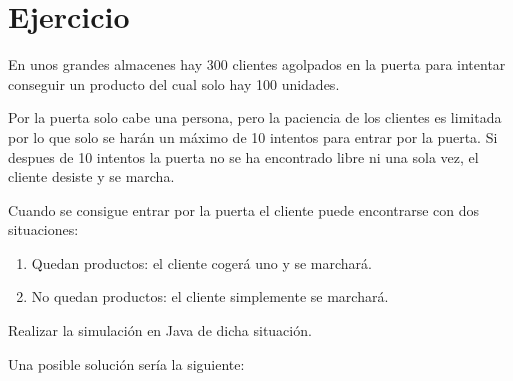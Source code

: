 \documentclass[letterpaper,10pt,spanish]{sphinxmanual}
\begin{document}
\section{Ejercicio}
\label{\detokenize{textos/tema2:ejercicio}}
En unos grandes almacenes hay 300 clientes agolpados en la puerta para intentar conseguir un producto del cual solo hay 100 unidades.

Por la puerta solo cabe una persona, pero la paciencia de los clientes es limitada por lo que solo se harán un máximo de 10 intentos para entrar por la puerta. Si despues de 10 intentos la puerta no se ha encontrado libre ni una sola vez, el cliente desiste y se marcha.

Cuando se consigue entrar por la puerta el cliente puede encontrarse con dos situaciones:
\begin{enumerate}
\def\theenumi{\arabic{enumi}}
\def\labelenumi{\theenumi .}
\makeatletter\def\p@enumii{\p@enumi \theenumi .}\makeatother
\item {} 
Quedan productos: el cliente cogerá uno y se marchará.

\item {} 
No quedan productos: el cliente simplemente se marchará.

\end{enumerate}

Realizar la simulación en Java de dicha situación.

Una posible solución sería la siguiente:
\end{document}
